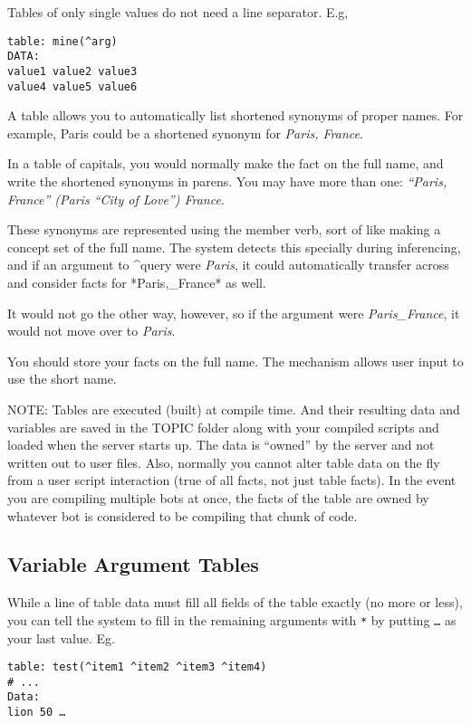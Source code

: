 \documentclass[]{article}
\begin{document}
Tables of only single values do not need a line separator. E.g,

\begin{verbatim}
table: mine(^arg)
DATA:
value1 value2 value3
value4 value5 value6
\end{verbatim}

A table allows you to automatically list shortened synonyms of proper
names. For example, Paris could be a shortened synonym for \emph{Paris,
France}.

In a table of capitals, you would normally make the fact on the full
name, and write the shortened synonyms in parens. You may have more than
one: \emph{``Paris, France'' (Paris ``City of Love'') France}.

These synonyms are represented using the member verb, sort of like
making a concept set of the full name. The system detects this specially
during inferencing, and if an argument to \^{}query were \emph{Paris},
it could automatically transfer across and consider facts for
*Paris,\_France* as well.

It would not go the other way, however, so if the argument were
\emph{Paris\_France}, it would not move over to \emph{Paris}.

You should store your facts on the full name. The mechanism allows user
input to use the short name.

NOTE: Tables are executed (built) at compile time. And their resulting
data and variables are saved in the TOPIC folder along with your
compiled scripts and loaded when the server starts up. The data is
``owned'' by the server and not written out to user files. Also,
normally you cannot alter table data on the fly from a user script
interaction (true of all facts, not just table facts). In the event you
are compiling multiple bots at once, the facts of the table are owned by
whatever bot is considered to be compiling that chunk of code.

\subsection{Variable Argument Tables}\label{variable-argument-tables}

While a line of table data must fill all fields of the table exactly (no
more or less), you can tell the system to fill in the remaining
arguments with \texttt{*} by putting \texttt{\ldots{}} as your last
value. Eg.

\begin{verbatim}
table: test(^item1 ^item2 ^item3 ^item4)
# ...
Data:
lion 50 …
\end{verbatim}
\end{document}
